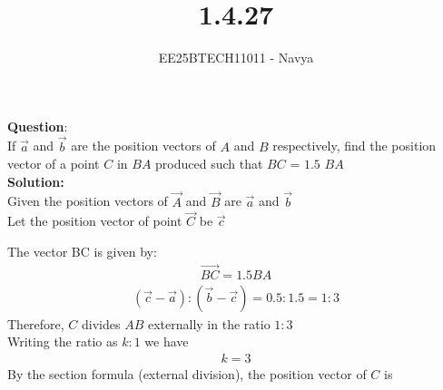 \documentclass[journal]{IEEEtran}
\begin{document}

\vspace{3cm}

\title{1.4.27}
\author{EE25BTECH11011 - Navya}
{\let\newpage\relax\maketitle}

\renewcommand{\thefigure}{\theenumi}
\renewcommand{\thetable}{\theenumi}
\setlength{\intextsep}{10pt} %
\textbf{Question}:\\
If $\vec{a}$ and $\vec{b}$ are the position vectors of $A$ and $B$ respectively, find the position vector of a point $C$ in $BA$ produced such that $BC$ = $1.5$ $BA$\\

\textbf{Solution:} \\
Given the position vectors of $\vec{A}$ and  $\vec{B}$  are  $\vec{a}$ and  $\vec{b}$ \\
Let the position vector of point $\vec{C}$ be  $\vec{c}$ 

The vector {BC} is given by:
\begin{align}
\vec{BC}=   1.5{BA}
\end{align}
\begin{align}
 (\vec{c}-\vec{a}) : (\vec{b}-\vec{c}) = 0.5 : 1.5 = 1 : 3 
\end{align}
Therefore, $ C $ divides $ AB $ externally in the ratio $ 1:3 $\\

Writing the ratio as $ k:1 $ 
we have 
\begin{align}
k=3
\end{align}
By the section formula (external division), the position vector of $C$  is\\
\end{document}
